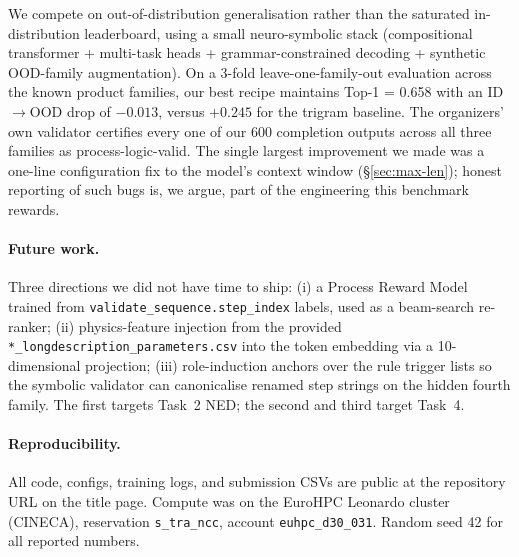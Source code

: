 \documentclass[11pt,a4paper]{article}
\begin{document}
We compete on out-of-distribution generalisation rather than the saturated in-distribution leaderboard, using a small neuro-symbolic stack (compositional transformer + multi-task heads + grammar-constrained decoding + synthetic OOD-family augmentation). On a 3-fold leave-one-family-out evaluation across the known product families, our best recipe maintains Top-1 = 0.658 with an ID$\rightarrow$OOD drop of $-0.013$, versus $+0.245$ for the trigram baseline. The organizers' own validator certifies every one of our 600 completion outputs across all three families as process-logic-valid. The single largest improvement we made was a one-line configuration fix to the model's context window (\S\ref{sec:max-len}); honest reporting of such bugs is, we argue, part of the engineering this benchmark rewards.

\paragraph{Future work.} Three directions we did not have time to ship: (i) a Process Reward Model trained from \texttt{validate\_sequence.step\_index} labels, used as a beam-search re-ranker; (ii) physics-feature injection from the provided \texttt{*\_longdescription\_parameters.csv} into the token embedding via a 10-dimensional projection; (iii) role-induction anchors over the rule trigger lists so the symbolic validator can canonicalise renamed step strings on the hidden fourth family. The first targets Task~2 NED; the second and third target Task~4.

\paragraph{Reproducibility.} All code, configs, training logs, and submission CSVs are public at the repository URL on the title page. Compute was on the EuroHPC Leonardo cluster (CINECA), reservation \texttt{s\_tra\_ncc}, account \texttt{euhpc\_d30\_031}. Random seed 42 for all reported numbers.
\end{document}
